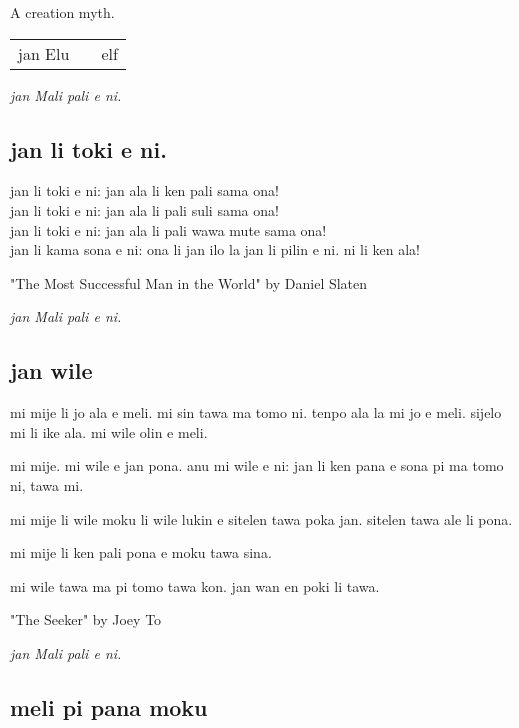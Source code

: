 A creation myth.

\begin{supertabular}{p{5,5cm}|ll}
jan Elu && elf \\
\end{supertabular}

\textit{jan Mali pali e ni. \cite{www:astrodonunt:01}}

\subsection{jan li toki e ni.}

jan li toki e ni: jan ala li ken pali sama ona! \\
jan li toki e ni: jan ala li pali suli sama ona! \\
jan li toki e ni: jan ala li pali wawa mute sama ona! \\
jan li kama sona e ni: ona li jan ilo la jan li pilin e ni. ni li ken ala! 

"The Most Successful Man in the World" by Daniel Slaten

\textit{jan Mali pali e ni. \cite{www:astrodonunt:01}}

\newpage
\subsection{jan wile}

mi mije li jo ala e meli. 
mi sin tawa ma tomo ni. 
tenpo ala la mi jo e meli. 
sijelo mi li ike ala. 
mi wile olin e meli.

mi mije. 
mi wile e jan pona. 
anu mi wile e ni: jan li ken pana e sona pi ma tomo ni, tawa mi.

mi mije li wile moku li wile lukin e sitelen tawa poka jan. 
sitelen tawa ale li pona.

mi mije li ken pali pona e moku tawa sina.

mi wile tawa ma pi tomo tawa kon. 
jan wan en poki li tawa.

"The Seeker" by Joey To

\textit{jan Mali pali e ni. \cite{www:astrodonunt:01}}

\subsection{meli pi pana moku}

